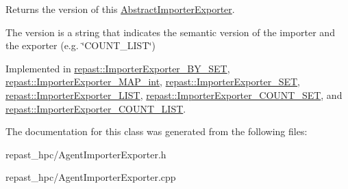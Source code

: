 Returns the version of this \hyperlink{classrepast_1_1_abstract_importer_exporter}{Abstract\-Importer\-Exporter}. 

The version is a string that indicates the semantic version of the importer and the exporter (e.\-g. \char`\"{}\-C\-O\-U\-N\-T\-\_\-\-L\-I\-S\-T\char`\"{}) 

Implemented in \hyperlink{classrepast_1_1_importer_exporter___b_y___s_e_t_a440dc78901d8811ba6046d769df298d9}{repast\-::\-Importer\-Exporter\-\_\-\-B\-Y\-\_\-\-S\-E\-T}, \hyperlink{classrepast_1_1_importer_exporter___m_a_p__int_a801fce0ea8f65aa5b23cc9b1cc9dd818}{repast\-::\-Importer\-Exporter\-\_\-\-M\-A\-P\-\_\-int}, \hyperlink{classrepast_1_1_importer_exporter___s_e_t_a94bcc5a0cb77c6550927663b04410ca2}{repast\-::\-Importer\-Exporter\-\_\-\-S\-E\-T}, \hyperlink{classrepast_1_1_importer_exporter___l_i_s_t_a548c16411acb6e380e9e27139148e294}{repast\-::\-Importer\-Exporter\-\_\-\-L\-I\-S\-T}, \hyperlink{classrepast_1_1_importer_exporter___c_o_u_n_t___s_e_t_a4feec2dc77e01798f1331381198ce3e7}{repast\-::\-Importer\-Exporter\-\_\-\-C\-O\-U\-N\-T\-\_\-\-S\-E\-T}, and \hyperlink{classrepast_1_1_importer_exporter___c_o_u_n_t___l_i_s_t_a576d3dc96aa00bab8a4f0bbe6e64981c}{repast\-::\-Importer\-Exporter\-\_\-\-C\-O\-U\-N\-T\-\_\-\-L\-I\-S\-T}.



The documentation for this class was generated from the following files\-:\begin{DoxyCompactItemize}
\item 
repast\-\_\-hpc/Agent\-Importer\-Exporter.\-h\item 
repast\-\_\-hpc/Agent\-Importer\-Exporter.\-cpp\end{DoxyCompactItemize}
